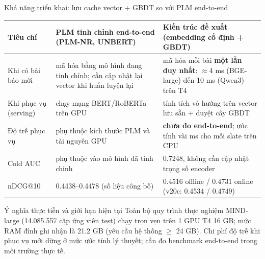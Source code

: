 \documentclass[aspectratio=169,t]{beamer}
\begin{document}
\begin{frame}[shrink]{Khả năng triển khai: lưu cache vector + GBDT so với PLM end-to-end}
\scriptsize
\renewcommand{\arraystretch}{1.12}
\begin{tabularx}{\textwidth}{@{}P{2.2cm}YY@{}}
\toprule
\textbf{Tiêu chí} & \textbf{PLM tinh chỉnh end-to-end (PLM-NR, UNBERT)} & \textbf{Kiến trúc đề xuất (embedding cố định + GBDT)}\\
\midrule
Khi có bài báo mới & mã hóa bằng mô hình đang tinh chỉnh; cần cập nhật lại vector khi huấn luyện lại & mã hóa mỗi bài \textbf{một lần duy nhất}: $\approx$4 ms (BGE-large) đến 10 ms (Qwen3) trên T4\\
Khi phục vụ (serving) & chạy mạng BERT/RoBERTa trên GPU & tính tích vô hướng trên vector lưu sẵn + duyệt cây GBDT\\
Độ trễ phục vụ & phụ thuộc kích thước PLM và tài nguyên GPU & \textbf{chưa đo end-to-end}; ước tính vài ms cho mỗi slate trên CPU\\
Cold AUC & phụ thuộc vào mô hình đã tinh chỉnh & 0.7248, không cần cập nhật trọng số encoder\\
nDCG@10 & 0.4438--0.4478 (số liệu công bố) & 0.4516 offline / 0.4731 online (v20c: 0.4534 / 0.4749)\\
\bottomrule
\end{tabularx}
\begin{alertblock}{Ý nghĩa thực tiễn và giới hạn hiện tại}
\scriptsize Toàn bộ quy trình thực nghiệm MIND-large (14.085.557 cặp ứng viên test) chạy trọn vẹn trên 1 GPU T4 16 GB; mức RAM đỉnh ghi nhận là 21.2 GB (yêu cầu hệ thống $\ge$ 24 GB).
Chi phí độ trễ khi phục vụ mới dừng ở mức ước tính lý thuyết; cần đo benchmark end-to-end trong môi trường thực tế.
\end{alertblock}
\par\kern0pt%
\end{frame}

\end{document}
